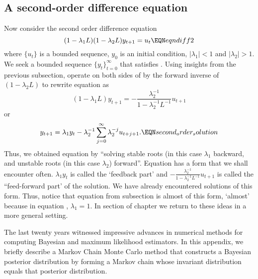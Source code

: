 \subsection{A second-order difference equation}
Now consider the second order difference equation
$$ (1-\lambda_1 L) (1 - \lambda_2 L) y_{t+1} = u_t  \EQN eqndiff2$$
where $\{u_t\}$ is  a bounded sequence, $y_0$ is an initial condition,
$| \lambda_1 | < 1$ and $| \lambda_2| >1$.  We seek a bounded sequence $\{y_t\}_{t=0}^\infty$ that
satisfies .  Using insights from the previous subsection, operate on both sides
of  by the forward inverse of $(1-\lambda_2 L)$ to rewrite equation  as
$$ (1-\lambda_1 L) y_{t+1} = -{\frac{\lambda_2^{-1}}{1 - \lambda_2^{-1}L^{-1}}} u_{t+1} $$
or
$$ y_{t+1} = \lambda_1 y_t - \lambda_2^{-1} \sum_{j=0}^\infty \lambda_2^{-j} u_{t+j+1} . \EQN second_order_solution$$
Thus, we obtained equation  by ``solving stable roots (in this case $\lambda_1$ backward, and unstable
roots (in this case $\lambda_2$) forward''. Equation  has a form that we shall encounter often.
$\lambda_1 y_t$ is called the `feedback part' and $ -{\frac{\lambda_2^{-1}}{1 - \lambda_2^{-1}L^{-1}}} u_{t+1} $ is called
the ``feed-forward part' of the solution. We have already encountered solutions of this form.
Thus, notice that equation  from subsection  is almost of this form,
`almost' because in equation , $\lambda_1 =1$.
In section  of chapter  we return to these ideas in a more general setting.


\label{appB}%
The last twenty years witnessed impressive advances in  numerical methods for computing Bayesian and maximum likelihood estimators.
In this appendix, we briefly describe a  Markov Chain Monte Carlo method that constructs a Bayesian posterior distribution by forming a
Markov chain whose invariant distribution equals that posterior distribution.

